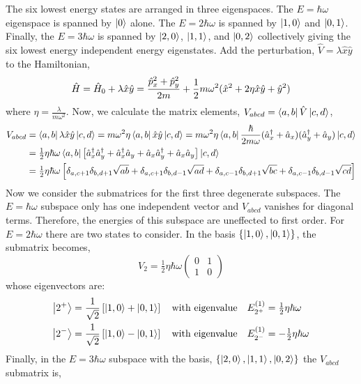 \documentclass[12pt]{extarticle}
\begin{document}
The six lowest energy states are arranged in three eigenspaces. The $E = \hbar \omega$ eigenspace is spanned by $\left| 0 \right>$ alone. The $E = 2 \hbar \omega$ is spanned by $\left| 1,0 \right>$ and $\left| 0,1 \right>$. Finally, the $E = 3 \hbar \omega$ is spanned by $\left| 2,0 \right>$, $\left| 1,1 \right>$, and $\left| 0,2 \right>$ collectively giving the six lowest energy independent energy eigenstates. Add the perturbation, $\hat{V} = \lambda \hat{x} \hat{y}$ to the Hamiltonian,
\[\hat{H} = \hat{H}_0 + \lambda \hat{x} \hat{y} = \frac{\hat{p}^2_x + \hat{p}^2_y}{2m} + \frac{1}{2} m \omega^2 (\hat{x}^2 + 2 \eta \hat{x} \hat{y} + \hat{y}^2)\]
where $\eta = \frac{\lambda}{m \omega^2}$. Now, we calculate the matrix elements, $V_{abcd} = \left< a,b \right| \hat{V} \left| c, d \right>$,
\begin{align*}
V_{abcd} & = \left< a,b \right| \lambda \hat{x} \hat{y} \left| c,d \right> = m \omega^2 \eta \left< a,b \right| \hat{x} \hat{y} \left| c,d \right> = m \omega^2 \eta \left< a,b \right| \frac{\hbar}{2 m \omega} (\hat{a}^\dagger_x + \hat{a}_x)(\hat{a}^\dagger_y + \hat{a}_y) \left| c,d \right> \\
& =  \tfrac{1}{2} \eta \hbar \omega \left< a,b \right| \left[ \hat{a}^\dagger_x \hat{a}^\dagger_y + \hat{a}^\dagger_x \hat{a}_y + \hat{a}_x \hat{a}^\dagger_y + \hat{a}_x \hat{a}_y \right] \left| c,d \right> \\ & = \tfrac{1}{2} \eta \hbar \omega \left[ \delta_{a,c + 1} \delta_{b, d + 1} \sqrt{ab} + \delta_{a,c + 1} \delta_{b, d - 1} \sqrt{ad} + \delta_{a, c - 1} \delta_{b, d + 1} \sqrt{bc} + \delta_{a, c - 1} \delta_{b, d - 1} \sqrt{cd} \right]
\end{align*}
Now we consider the submatrices for the first three degenerate subspaces. The $E = \hbar \omega$ subspace only has one independent vector and $V_{abcd}$ vanishes for diagonal terms. Therefore, the energies of this subspace are uneffected to first order. For $E = 2 \hbar \omega$ there are two states to consider. In the basis $\{\left| 1,0 \right>, \left| 0,1 \right>\}$, the submatrix becomes,
\[ V_2 = \tfrac{1}{2} \eta \hbar \omega \begin{pmatrix}
0 & 1 \\
1 & 0 
\end{pmatrix}\]
whose eigenvectors are:
\begin{align*}
\left| 2^+ \right> & = \frac{1}{\sqrt{2}} \left[ \left| 1,0 \right> + \left| 0,1 \right> \right] \quad \text{with eigenvalue} \quad E^{(1)}_{2^+} = \tfrac{1}{2} \eta \hbar \omega \\ 
\left| 2^- \right> & = \frac{1}{\sqrt{2}} \left[ \left| 1,0 \right> - \left| 0,1 \right> \right] \quad \text{with eigenvalue} \quad E^{(1)}_{2^-} = - \tfrac{1}{2} \eta \hbar \omega
\end{align*}
Finally, in the $E = 3 \hbar \omega$ subspace with the basis, $\{\left| 2,0 \right>, \left| 1,1 \right>, \left| 0,2 \right>\}$ the $V_{abcd}$ submatrix is,
\end{document}
